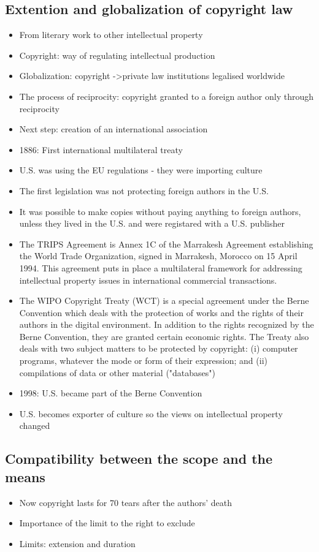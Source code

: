\documentclass{article}
\begin{document}
\subsection{Extention and globalization of copyright law}
\begin{itemize}
\item From literary work to other intellectual property 
\item Copyright: way of regulating intellectual production 
\item Globalization: copyright ->private law institutions legalised worldwide 
\item The process of reciprocity: copyright granted to a foreign author only through reciprocity 
\item Next step: creation of an international association 
\item 1886: First international multilateral treaty 
\item U.S. was using the EU regulations  - they were importing culture 
\item The first legislation was not protecting foreign authors in the U.S.
\item It was possible to make copies without paying anything to foreign authors, unless they lived in the U.S. and were registared with a U.S. publisher
\item The TRIPS Agreement is Annex 1C of the Marrakesh Agreement establishing the World Trade Organization, signed in Marrakesh, Morocco on 15 April 1994. This agreement puts in place a multilateral framework for addressing intellectual property issues in international commercial transactions.
\item The WIPO Copyright Treaty (WCT) is a special agreement under the Berne Convention which deals with the protection of works and the rights of their authors in the digital environment. In addition to the rights recognized by the Berne Convention, they are granted certain economic rights.  The Treaty also deals with two subject matters to be protected by copyright: (i) computer programs, whatever the mode or form of their expression; and (ii) compilations of data or other material ("databases")
\item 1998: U.S. became part of the Berne Convention
\item U.S. becomes exporter of culture so the views on intellectual property changed 
\end{itemize}

\subsection{Compatibility between the scope and the means}
\begin{itemize}
\item Now copyright lasts for 70 tears after the authors' death 
\item Importance of the limit to the right to exclude
\item Limits: extension and duration
\end{itemize}
\end{document}
